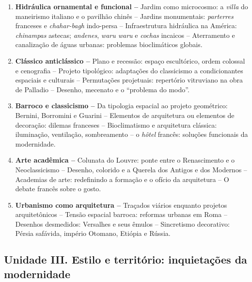 \documentclass[
  11pt,
  brazil,
  a4paper,
]{article}
\begin{document}
\begin{enumerate}
\def\labelenumi{\arabic{enumi}.}
\setcounter{enumi}{5}
\item
  \textbf{Hidráulica ornamental e funcional --} Jardim como microcosmo:
  a \emph{villa} do maneirismo italiano e o pavilhão chinês -- Jardins
  monumentais: \emph{parterres} franceses e \emph{chahar-bagh}
  indo-persa -- Infraestrutura hidráulica na América: \emph{chinampas}
  astecas; \emph{andenes}, \emph{waru waru} e \emph{cochas} incaicos --
  Aterramento e canalização de águas urbanas: problemas bioclimáticos
  globais.
\item
  \textbf{Clássico anticlássico --} Plano e recessão: espaço
  escultórico, ordem colossal e cenografia -- Projeto tipológico:
  adaptações do classicismo a condicionantes espaciais e culturais --
  Permutações projetuais: repertório vitruviano na obra de Palladio --
  Desenho, mecenato e o ``problema do modo''.
\item
  \textbf{Barroco e classicismo --} Da tipologia espacial ao projeto
  geométrico: Bernini, Borromini e Guarini -- Elementos de arquitetura
  ou elementos de decoração: dilemas franceses -- Bioclimatismo e
  arquitetura clássica: iluminação, ventilação, sombreamento -- o
  \emph{hôtel} francês: soluções funcionais da modernidade.
\item
  \textbf{Arte acadêmica --} Colunata do Louvre: ponte entre o
  Renascimento e o Neoclassicismo -- Desenho, colorido e a Querela dos
  Antigos e dos Modernos -- Academias de arte: redefinindo a formação e
  o ofício da arquitetura -- O debate francês sobre o gosto.
\item
  \textbf{Urbanismo como arquitetura --} Traçados viários enquanto
  projetos arquitetônicos -- Tensão espacial barroca: reformas urbanas
  em Roma -- Desenhos desmedidos: Versalhes e seus êmulos -- Sincretismo
  decorativo: Pérsia safávida, império Otomano, Etiópia e Rússia.
\end{enumerate}

\hypertarget{unidade-iii.-estilo-e-territuxf3rio-inquietauxe7uxf5es-da-modernidade}{%
\subsection{Unidade III. Estilo e território: inquietações da
modernidade}\label{unidade-iii.-estilo-e-territuxf3rio-inquietauxe7uxf5es-da-modernidade}}
\end{document}
